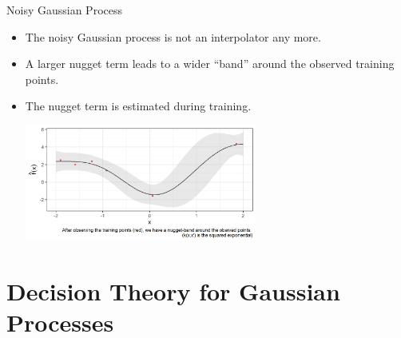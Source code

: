 \begin{vbframe}{Noisy Gaussian Process}
\begin{itemize}
\framebreak 

\item The noisy Gaussian process is not an interpolator any more.
\item A larger nugget term leads to a wider ``band'' around the observed training points.
\item The nugget term is estimated during training.


\begin{center}
    \includegraphics[width=0.6\textwidth]{figure_man/gp-regression.png}
\end{center}
\end{itemize}

\end{vbframe}



\section{Decision Theory for Gaussian Processes}

